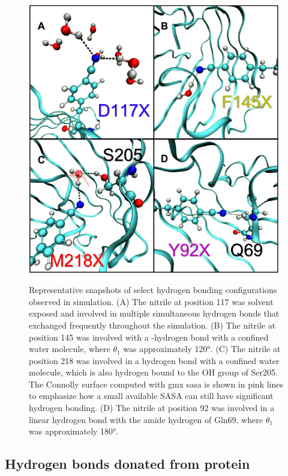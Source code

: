 \begin{figure}
    \center
    \includegraphics[width=\single]{figures-gfp-hbond/snapshots.png}
    \caption[Representative snapshots of select hydrogen bonding configurations observed in simulation]{
        Representative snapshots of select hydrogen bonding configurations observed in simulation. 
        (A) The nitrile at position 117 was solvent exposed and involved in multiple simultaneous hydrogen bonds that exchanged frequently throughout the simulation. 
        (B) The nitrile at position 145 was involved with a \textpi{}-hydrogen bond with a confined water molecule, where $\theta_1$ was approximately \ang{120}. 
        (C) The nitrile at position 218 was involved in a hydrogen bond with a confined water molecule, which is also hydrogen bound to the OH group of Ser205. 
        The Connolly surface computed with gmx sasa is shown in pink lines to emphasize how a small available SASA can still have significant hydrogen bonding. 
        (D) The nitrile at position 92 was involved in a linear hydrogen bond with the amide hydrogen of Gln69, where $\theta_1$ was approximately \ang{180}.
    }
    \label{fig:hbond-snapshot}
\end{figure}

\subsection{Hydrogen bonds donated from protein}

